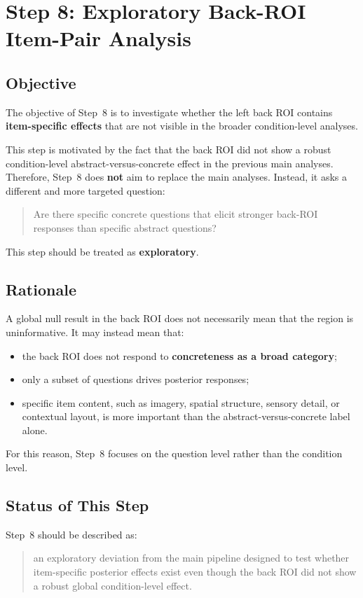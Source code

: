 \section{Step 8: Exploratory Back-ROI Item-Pair Analysis}
\label{sec:step8_back_roi_items}

\subsection{Objective}
The objective of Step~8 is to investigate whether the left back ROI contains
\textbf{item-specific effects} that are not visible in the broader condition-level analyses.

This step is motivated by the fact that the back ROI did not show a robust
condition-level abstract-versus-concrete effect in the previous main analyses.
Therefore, Step~8 does \textbf{not} aim to replace the main analyses.
Instead, it asks a different and more targeted question:
\begin{quote}
Are there specific concrete questions that elicit stronger back-ROI responses than specific abstract questions?
\end{quote}

This step should be treated as \textbf{exploratory}.

\subsection{Rationale}
A global null result in the back ROI does not necessarily mean that the region is uninformative.
It may instead mean that:
\begin{itemize}
    \item the back ROI does not respond to \textbf{concreteness as a broad category};
    \item only a subset of questions drives posterior responses;
    \item specific item content, such as imagery, spatial structure, sensory detail, or contextual layout,
    is more important than the abstract-versus-concrete label alone.
\end{itemize}

For this reason, Step~8 focuses on the question level rather than the condition level.

\subsection{Status of This Step}
Step~8 should be described as:
\begin{quote}
an exploratory deviation from the main pipeline designed to test whether item-specific posterior effects
exist even though the back ROI did not show a robust global condition-level effect.
\end{quote}


